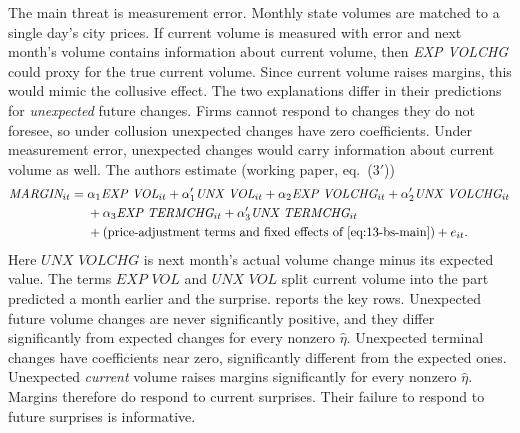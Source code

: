 The main threat is measurement error. Monthly state volumes are matched to a single day's city prices. If
current volume is measured with error and next month's volume contains information about current volume, then
\textit{EXP VOLCHG} could proxy for the true current volume. Since current volume raises margins, this would
mimic the collusive effect. The two explanations differ in their predictions for \emph{unexpected} future
changes. Firms cannot respond to changes they do not foresee, so under collusion unexpected changes have zero
coefficients. Under measurement error, unexpected changes would carry information about current volume as
well. The authors estimate (working paper, eq.~(3$'$))
\begin{equation}\label{eq:13-bs-unx}
\begin{aligned}
\textit{MARGIN}_{it}={}&\alpha_1\textit{EXP VOL}_{it}+\alpha'_1\textit{UNX VOL}_{it}+\alpha_2\textit{EXP VOLCHG}_{it}
+\alpha'_2\textit{UNX VOLCHG}_{it}\\
&+\alpha_3\textit{EXP TERMCHG}_{it}+\alpha'_3\textit{UNX TERMCHG}_{it}\\
&+(\text{price-adjustment terms and fixed effects of \eqref{eq:13-bs-main}})+e_{it}.
\end{aligned}
\end{equation}
Here $\textit{UNX VOLCHG}$ is next month's actual volume change minus its expected value. The terms
$\textit{EXP VOL}$ and $\textit{UNX VOL}$ split current volume into the part predicted a month earlier and the
surprise.
 reports the key rows. Unexpected future volume changes are never significantly positive, and
they differ significantly from expected changes for every nonzero $\hat\eta$. Unexpected terminal changes have
coefficients near zero, significantly different from the expected ones. Unexpected \emph{current} volume
raises margins significantly for every nonzero $\hat\eta$. Margins therefore do respond to current surprises.
Their failure to respond to future surprises is informative.

